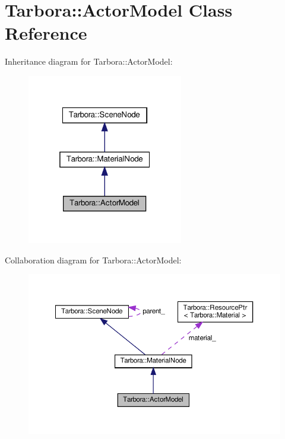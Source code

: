 \hypertarget{classTarbora_1_1ActorModel}{}\section{Tarbora\+:\+:Actor\+Model Class Reference}
\label{classTarbora_1_1ActorModel}


Inheritance diagram for Tarbora\+:\+:Actor\+Model\+:\nopagebreak
\begin{figure}[H]
\begin{center}
\leavevmode
\includegraphics[width=193pt]{classTarbora_1_1ActorModel__inherit__graph}
\end{center}
\end{figure}


Collaboration diagram for Tarbora\+:\+:Actor\+Model\+:\nopagebreak
\begin{figure}[H]
\begin{center}
\leavevmode
\includegraphics[width=350pt]{classTarbora_1_1ActorModel__coll__graph}
\end{center}
\end{figure}
